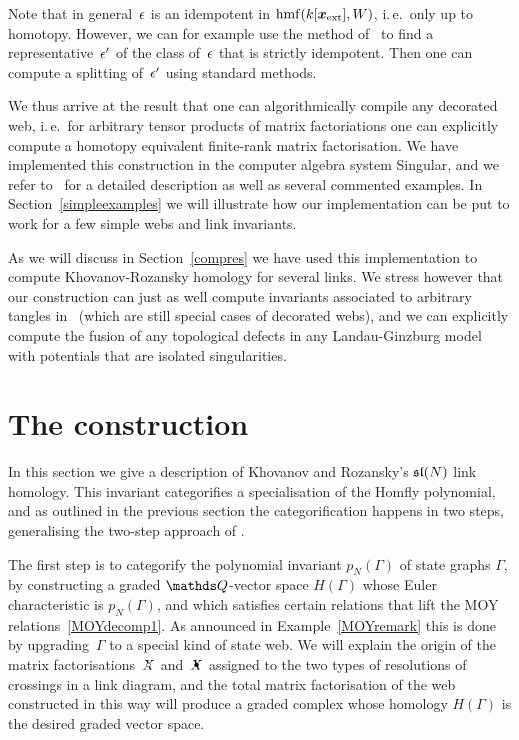 \documentclass{compositio}
\theoremstyle{definition}
\numberwithin{equation}{section}
\begin{document}
Note that in general~$\epsilon$ is an idempotent in $\operatorname{hmf}(k[\boldsymbol{x}_{\textup{ext}}],W)$, i.\,e.~only up to homotopy. However, we can for example use the method of~\cite[Section~3.6]{LambekRingsModules} to find a representative~$\epsilon'$ of the class of~$\epsilon$ that is strictly idempotent. Then one can compute a splitting of~$\epsilon'$ using standard methods. 

We thus arrive at the result that one can algorithmically compile any decorated web, i.\,e.~for arbitrary tensor products of matrix factoriations one can explicitly compute a homotopy equivalent finite-rank matrix factorisation. We have implemented this construction in the computer algebra system Singular, and we refer to~\cite{cmWebCompileCode} for a detailed description as well as several commented examples. In Section~\ref{simpleexamples} we will illustrate how our implementation can be put to work for a few simple webs and link invariants. 

As we will discuss in Section~\ref{compres} we have used this implementation to compute Khovanov-Rozansky homology for several links. We stress however that our construction can just as well compute invariants associated to arbitrary tangles in~\cite{kr0401268} (which are still special cases of decorated webs), and we can explicitly compute the fusion of any topological defects in any Landau-Ginzburg model with potentials that are isolated singularities.

\section{The construction}
\label{KRconstruction}

In this section we give a description of Khovanov and Rozansky's $\mathfrak{sl}(N)$ link homology. This invariant categorifies a specialisation of the Homfly polynomial, and as outlined in the previous section the categorification happens in two steps, generalising the two-step approach of \cite{moy1998}. 

The first step is to categorify the polynomial invariant $p_N(\Gamma)$ of state graphs $\Gamma$, by constructing a graded $\QQ$-vector space $H(\Gamma)$ whose Euler characteristic is $p_N(\Gamma)$, and which satisfies certain relations that lift the MOY relations~\eqref{MOYdecomp1}. As announced in Example~\ref{MOYremark} this is done by upgrading~$\Gamma$ to a special kind of state web. We will explain the origin of the matrix factorisations~$\Xcirc$ and~$\Xbul$ assigned to the two types of resolutions of crossings in a link diagram, and the total matrix factorisation of the web constructed in this way will produce a graded complex whose homology $H(\Gamma)$ is the desired graded vector space.
\end{document}
